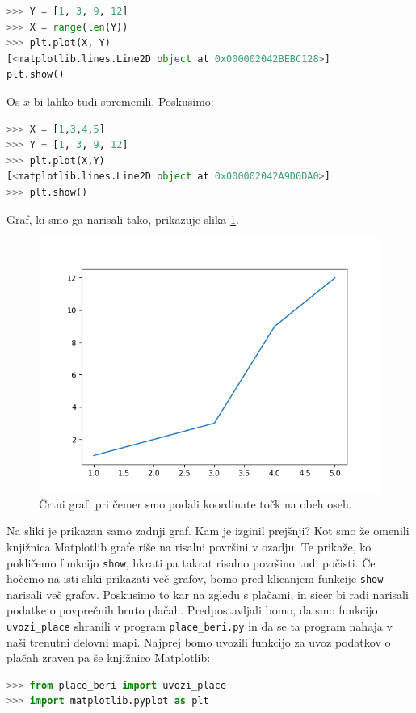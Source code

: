 \begin{lstlisting}[language=Python, showstringspaces=false]
>>> Y = [1, 3, 9, 12]
>>> X = range(len(Y))
>>> plt.plot(X, Y)
[<matplotlib.lines.Line2D object at 0x000002042BEBC128>]
plt.show()
\end{lstlisting}
Os $x$ bi lahko tudi spremenili. Poskusimo:
\begin{lstlisting}[language=Python, showstringspaces=false]
>>> X = [1,3,4,5]
>>> Y = [1, 3, 9, 12]
>>> plt.plot(X,Y)
[<matplotlib.lines.Line2D object at 0x000002042A9D0DA0>]
>>> plt.show()
\end{lstlisting}
Graf, ki smo ga narisali tako, prikazuje slika \ref{img:plt2}.
\begin{figure}
    \includegraphics[width=\linewidth]{img/plt2.png}
    \caption{Črtni graf, pri čemer smo podali koordinate točk na obeh oseh.}
    \label{img:plt2}
\end{figure}
Na sliki je prikazan samo zadnji graf. Kam je izginil prejšnji? Kot smo že omenili knjižnica Matplotlib grafe riše na risalni površini v ozadju. Te prikaže, ko pokličemo funkcijo \texttt{show}, hkrati pa takrat risalno površino tudi počisti. Če hočemo na isti sliki prikazati več grafov, bomo pred klicanjem funkcije \texttt{show} narisali več grafov. Poskusimo to kar na zgledu s plačami, in sicer bi radi narisali podatke o povprečnih bruto plačah. Predpostavljali bomo, da smo funkcijo \texttt{uvozi\_place} shranili v program \texttt{place\_beri.py} in da se ta program nahaja v naši trenutni delovni mapi. Najprej bomo uvozili funkcijo za uvoz podatkov o plačah zraven pa še knjižnico Matplotlib:
\begin{lstlisting}[language=Python, showstringspaces=false]
>>> from place_beri import uvozi_place
>>> import matplotlib.pyplot as plt
\end{lstlisting}
